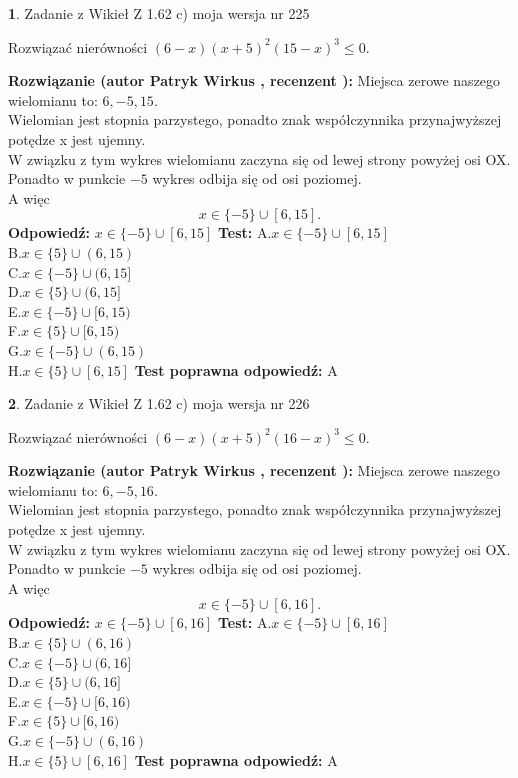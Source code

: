 \documentclass[12pt, a4paper]{article}
\theoremstyle{definition} %
\newtheorem{zad}{}
\newcommand{\zadStart}[1]{\begin{zad}#1\newline}
\newcommand{\zadStop}{\end{zad}}
\newcommand{\rozwStart}[2]{\noindent \textbf{Rozwiązanie (autor #1 , recenzent #2): }\newline}
\newcommand{\rozwStop}{\newline}
\newcommand{\odpStart}{\noindent \textbf{Odpowiedź:}\newline}
\newcommand{\odpStop}{\newline}
\newcommand{\testStart}{\noindent \textbf{Test:}\newline}
\newcommand{\testStop}{\newline}
\newcommand{\kluczStart}{\noindent \textbf{Test poprawna odpowiedź:}\newline}
\newcommand{\kluczStop}{\newline}
\begin{document}
\zadStart{Zadanie z Wikieł Z 1.62 c) moja wersja nr 225}

Rozwiązać nierówności $(6-x)(x+5)^{2}(15-x)^{3}\le0$.
\zadStop
\rozwStart{Patryk Wirkus}{}
Miejsca zerowe naszego wielomianu to: $6, -5, 15$.\\
Wielomian jest stopnia parzystego, ponadto znak współczynnika przy\linebreak najwyższej potędze x jest ujemny.\\ W związku z tym wykres wielomianu zaczyna się od lewej strony powyżej osi OX.\\
Ponadto w punkcie $-5$ wykres odbija się od osi poziomej.\\
A więc $$x \in \{-5\} \cup [6,15].$$
\rozwStop
\odpStart
$x \in \{-5\} \cup [6,15]$
\odpStop
\testStart
A.$x \in \{-5\} \cup [6,15]$\\
B.$x \in \{5\} \cup (6,15)$\\
C.$x \in \{-5\} \cup (6,15]$\\
D.$x \in \{5\} \cup (6,15]$\\
E.$x \in \{-5\} \cup [6,15)$\\
F.$x \in \{5\} \cup [6,15)$\\
G.$x \in \{-5\} \cup (6,15)$\\
H.$x \in \{5\} \cup [6,15]$
\testStop
\kluczStart
A
\kluczStop



\zadStart{Zadanie z Wikieł Z 1.62 c) moja wersja nr 226}

Rozwiązać nierówności $(6-x)(x+5)^{2}(16-x)^{3}\le0$.
\zadStop
\rozwStart{Patryk Wirkus}{}
Miejsca zerowe naszego wielomianu to: $6, -5, 16$.\\
Wielomian jest stopnia parzystego, ponadto znak współczynnika przy\linebreak najwyższej potędze x jest ujemny.\\ W związku z tym wykres wielomianu zaczyna się od lewej strony powyżej osi OX.\\
Ponadto w punkcie $-5$ wykres odbija się od osi poziomej.\\
A więc $$x \in \{-5\} \cup [6,16].$$
\rozwStop
\odpStart
$x \in \{-5\} \cup [6,16]$
\odpStop
\testStart
A.$x \in \{-5\} \cup [6,16]$\\
B.$x \in \{5\} \cup (6,16)$\\
C.$x \in \{-5\} \cup (6,16]$\\
D.$x \in \{5\} \cup (6,16]$\\
E.$x \in \{-5\} \cup [6,16)$\\
F.$x \in \{5\} \cup [6,16)$\\
G.$x \in \{-5\} \cup (6,16)$\\
H.$x \in \{5\} \cup [6,16]$
\testStop
\kluczStart
A
\kluczStop
\end{document}
